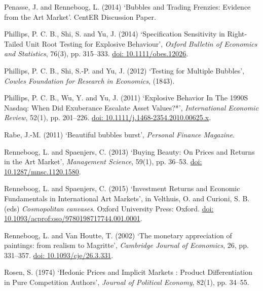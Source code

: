 \documentclass[12pt,]{article}
\begin{document}
Penasse, J. and Renneboog, L. (2014) `Bubbles and Trading Frenzies:
Evidence from the Art Market'. CentER Discussion Paper.

Phillips, P. C. B., Shi, S. and Yu, J. (2014) `Specification Sensitivity
in Right-Tailed Unit Root Testing for Explosive Behaviour', \emph{Oxford
Bulletin of Economics and Statistics}, 76(3), pp. 315--333.
\href{http://doi.org/10.1111/obes.12026}{doi: 10.1111/obes.12026}.

Phillips, P. C. B., Shi, S.-P. and Yu, J. (2012) `Testing for Multiple
Bubbles', \emph{Cowles Foundation for Research in Economics}, (1843).

Phillips, P. C. B., Wu, Y. and Yu, J. (2011) `Explosive Behavior In The
1990S Nasdaq: When Did Exuberance Escalate Asset Values?*',
\emph{International Economic Review}, 52(1), pp. 201--226.
\href{http://doi.org/10.1111/j.1468-2354.2010.00625.x}{doi: 10.1111/j.1468-2354.2010.00625.x}.

Rabe, J.-M. (2011) `Beautiful bubbles burst', \emph{Personal Finance
Magazine}.

Renneboog, L. and Spaenjers, C. (2013) `Buying Beauty: On Prices and
Returns in the Art Market', \emph{Management Science}, 59(1), pp.
36--53.
\href{http://doi.org/10.1287/mnsc.1120.1580}{doi: 10.1287/mnsc.1120.1580}.

Renneboog, L. and Spaenjers, C. (2015) `Investment Returns and Economic
Fundamentals in International Art Markets', in Velthuis, O. and Curioni,
S. B. (eds) \emph{Cosmopolitan canvases}. Oxford University Press:
Oxford.
\href{http://doi.org/10.1093/acprof:oso/9780198717744.001.0001}{doi: 10.1093/acprof:oso/9780198717744.001.0001}.

Renneboog, L. and Van Houtte, T. (2002) `The monetary appreciation of
paintings: from realism to Magritte', \emph{Cambridge Journal of
Economics}, 26, pp. 331--357.
\href{http://doi.org/10.1093/cje/26.3.331}{doi: 10.1093/cje/26.3.331}.

Rosen, S. (1974) `Hedonic Prices and Implicit Markets : Product
Differentiation in Pure Competition Authors', \emph{Journal of Political
Economy}, 82(1), pp. 34--55.
\end{document}
